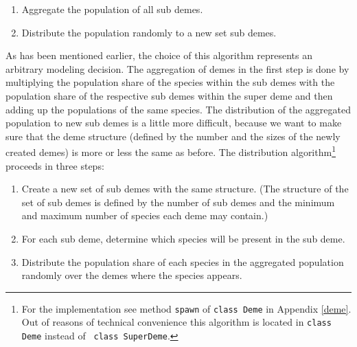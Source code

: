 \begin{enumerate}

\item Aggregate the population of all sub demes.

\item Distribute the population randomly to a new set sub demes.

\end{enumerate}

As has been mentioned earlier, the choice of this algorithm represents an
arbitrary modeling decision. The aggregation of demes in the first step is
done by multiplying the population share of the species within the sub demes
with the population share of the respective sub demes within the super deme
and then adding up the populations of the same species. The distribution of
the aggregated population to new sub demes is a little more difficult, because
we want to make sure that the deme structure (defined by the number and the
sizes of the newly created demes) is more or less the same as before. The
distribution algorithm\footnote{For the implementation see method {\tt spawn}
  of {\tt class Deme} in Appendix \ref{deme}. Out of reasons of technical
  convenience this algorithm is located in {\tt class Deme} instead of {\tt
    class SuperDeme}.} proceeds in three steps:

\begin{enumerate}

\item Create a new set of sub demes with the same structure. (The
structure of the set of sub demes is defined by the number of sub demes
and the minimum and maximum number of species each deme may contain.)

\item For each sub deme, determine which species will be present in the
sub deme.

\item Distribute the population share of each species in the aggregated
population randomly over the demes where the species appears.

\end{enumerate}

